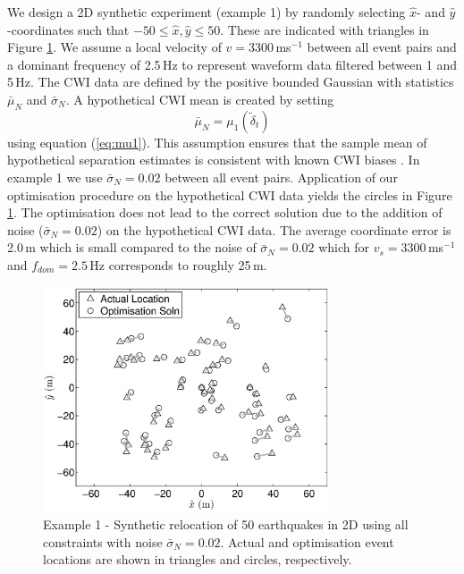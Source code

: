 \documentclass[extra, onecolumn, doublespacing]{gji}
\begin{document}
We design a 2D synthetic experiment (example 1) by randomly
selecting $\hat{x}$- and $\hat{y}$-coordinates such that $-50 \leq
\hat{x}, \hat{y} \leq 50$. These are indicated with triangles in
Figure \ref{fig-2D50eq-relocation_eg1}.
 We assume a local velocity of $v=3300\,$ms$^{-1}$ between all
event pairs and a dominant frequency of 2.5$\,$Hz to represent waveform data filtered between 1 and 5$\,$Hz.
The CWI data are defined by the positive bounded Gaussian with statistics
$\bar{\mu}_N$ and $\bar{\sigma}_N$. A hypothetical CWI mean is created by setting
\begin{equation}
\label{eq:hypothetical-CWI-mean-optichapt}
\bar{\mu}_N = \mu_1 \left( \widetilde{\delta}_t \right)
\end{equation}
using equation (\ref{eq:mu1}). This assumption ensures that the
sample mean of hypothetical separation estimates is consistent with
known CWI biases \citep{dr_Robinson11a}. In example 1 we use
$\bar{\sigma}_N=0.02$ between all event pairs. Application of our
optimisation procedure on the hypothetical CWI data yields the
circles in Figure \ref{fig-2D50eq-relocation_eg1}. The optimisation
does not lead to the correct solution due to the addition of noise
($\bar{\sigma}_N=0.02$) on the hypothetical CWI data. The average
coordinate error is 2.0\,m which is small compared to the noise of
$\bar{\sigma}_N=0.02$ which for $v_s=3300$\,ms$^{-1}$ and
$f_{dom}=2.5$\,Hz corresponds to roughly 25\,m.
\begin{figure}
\includegraphics[width = 20pc]{diags/locs_2D_50eq_1.eps}
\caption{Example 1 - Synthetic relocation of 50 earthquakes in 2D
using all constraints with noise $\bar{\sigma}_N=0.02$. Actual and
optimisation event locations are shown in triangles and circles,
respectively.} \label{fig-2D50eq-relocation_eg1}
\end{figure}
\end{document}
